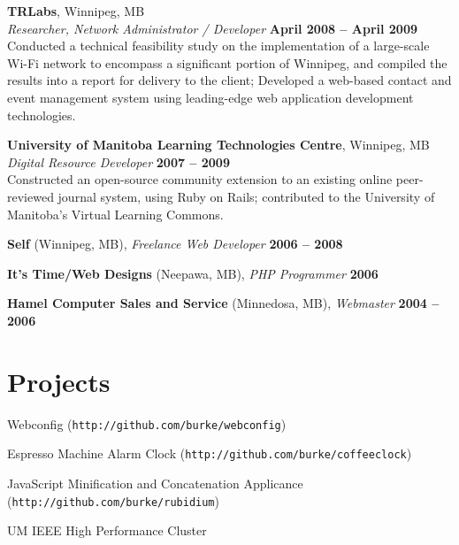 \documentclass[margin,line,letterpaper]{resume}
\begin{document}
\begin{resume}
  {\bf TRLabs}, Winnipeg, MB \vspace{2mm}\\\vspace{1mm}%
  {\sl Researcher, Network Administrator / Developer} \hfill {\bf April 2008 -- April 2009}\\
  Conducted a technical feasibility study on the implementation of a large-scale Wi-Fi
  network to encompass a significant portion of Winnipeg, and compiled the results into a report
  for delivery to the client; Developed a web-based contact and event management system using 
  leading-edge web application development technologies.

  {\bf University of Manitoba Learning Technologies Centre}, Winnipeg, MB \vspace{2mm}\\\vspace{1mm}%
  {\sl Digital Resource Developer} \hfill {\bf 2007 -- 2009}\\
  Constructed an open-source community extension to an existing online peer-reviewed journal 
  system, using Ruby on Rails; contributed to the University of Manitoba's Virtual Learning Commons.

  {\bf Self} (Winnipeg, MB), {\sl Freelance Web Developer} \hfill {\bf 2006 -- 2008}

  {\bf It's Time/Web Designs} (Neepawa, MB), {\sl PHP Programmer} \hfill {\bf 2006}

  {\bf Hamel Computer Sales and Service} (Minnedosa, MB), {\sl Webmaster} \hfill {\bf 2004 -- 2006}

  \section{\mysidestyle Projects}

  \begin{list2}
  \item Webconfig ({\tt http://github.com/burke/webconfig})
  \item Espresso Machine Alarm Clock ({\tt http://github.com/burke/coffeeclock})
  \item JavaScript Minification and Concatenation Applicance ({\tt http://github.com/burke/rubidium})
  \item UM IEEE High Performance Cluster
 \end{list2}


\end{resume}
\end{document}
